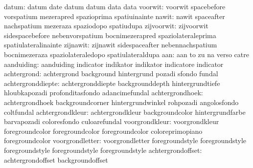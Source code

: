                     datum: datum                     date
                           datum                     datum
                           data                      data
                  voorwit: voorwit                   spacebefore
                           vorspatium                mezerapred
                           spazioprima               spatiuinainte
                    nawit: nawit                     spaceafter
                           nachspatium               mezeraza
                           spaziodopo                spatiudupa
               zijvoorwit: zijvoorwit                sidespacebefore
                           nebenvorspatium           bocnimezerapred
                           spaziolateraleprima       spatiulateralinainte
                 zijnawit: zijnawit                  sidespaceafter
                           nebennachspatium          bocnimezeraza
                           spaziolateraledopo        spatiulateraldupa
                      aan: aan                       to
                           zu                        na
                           verso                     catre
               aanduiding: aanduiding                indicator
                           indikator                 indikator
                           indicatore                indicator
              achtergrond: achtergrond               background
                           hintergrund               pozadi
                           sfondo                    fundal
        achtergronddiepte: achtergronddiepte         backgrounddepth
                           hintergrundtiefe          hloubkapozadi
                           profonditasfondo          adancimefundal
          achtergrondhoek: achtergrondhoek           backgroundcorner
                           hintergrundwinkel         rohpozadi
                           angolosfondo              coltfundal
         achtergrondkleur: achtergrondkleur          backgroundcolor
                           hintergrundfarbe          barvapozadi
                           coloresfondo              culoarefundal
           voorgrondkleur: voorgrondkleur            foregroundcolor
                           foregroundcolor           foregroundcolor
                           coloreprimopiano          foregroundcolor
          voorgrondletter: voorgrondletter           foregroundstyle
                           foregroundstyle           foregroundstyle
                           foregroundstyle           foregroundstyle
        achtergrondoffset: achtergrondoffset         backgroundoffset

